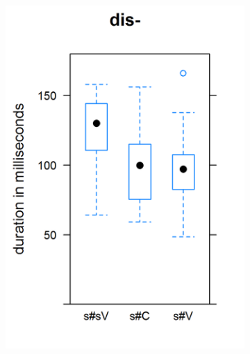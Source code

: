 \begin{figure}[t!]
		\begin{subfigure}
			\centering
			\includegraphics[scale=.55]{images/Corpus/boxDis.png}
		\end{subfigure}
		~
		\begin{subfigure}
			\centering

\end{subfigure}
\end{figure}
